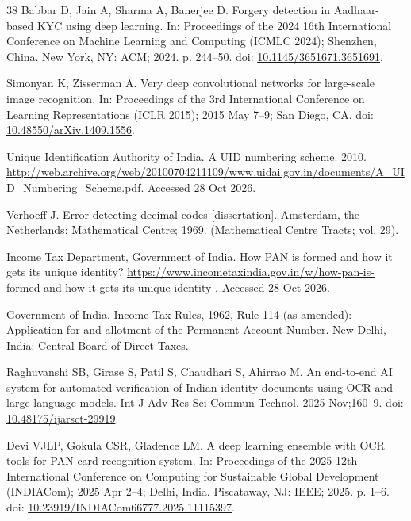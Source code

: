 \documentclass[12pt]{article}
\begin{document}
\begin{thebibliography}{38}
Babbar D, Jain A, Sharma A, Banerjee D. Forgery detection in Aadhaar-based KYC using deep learning. In: Proceedings of the 2024 16th International Conference on Machine Learning and Computing (ICMLC 2024); Shenzhen, China. New York, NY: ACM; 2024. p. 244--50. doi: \href{https://doi.org/10.1145/3651671.3651691}{10.1145/3651671.3651691}.

Simonyan K, Zisserman A. Very deep convolutional networks for large-scale image recognition. In: Proceedings of the 3rd International Conference on Learning Representations (ICLR 2015); 2015 May 7--9; San Diego, CA. doi: \href{https://doi.org/10.48550/arXiv.1409.1556}{10.48550/arXiv.1409.1556}.

Unique Identification Authority of India. A UID numbering scheme. 2010. \url{http://web.archive.org/web/20100704211109/www.uidai.gov.in/documents/A_UID_Numbering_Scheme.pdf}. Accessed 28 Oct 2026.

Verhoeff J. Error detecting decimal codes [dissertation]. Amsterdam, the Netherlands: Mathematical Centre; 1969. (Mathematical Centre Tracts; vol. 29).

Income Tax Department, Government of India. How PAN is formed and how it gets its unique identity? \url{https://www.incometaxindia.gov.in/w/how-pan-is-formed-and-how-it-gets-its-unique-identity-}. Accessed 28 Oct 2026.

Government of India. Income Tax Rules, 1962, Rule 114 (as amended): Application for and allotment of the Permanent Account Number. New Delhi, India: Central Board of Direct Taxes.

Raghuvanshi SB, Girase S, Patil S, Chaudhari S, Ahirrao M. An end-to-end AI system for automated verification of Indian identity documents using OCR and large language models. Int J Adv Res Sci Commun Technol. 2025 Nov;160--9. doi: \href{https://doi.org/10.48175/ijarsct-29919}{10.48175/ijarsct-29919}.

Devi VJLP, Gokula CSR, Gladence LM. A deep learning ensemble with OCR tools for PAN card recognition system. In: Proceedings of the 2025 12th International Conference on Computing for Sustainable Global Development (INDIACom); 2025 Apr 2--4; Delhi, India. Piscataway, NJ: IEEE; 2025. p. 1--6. doi: \href{https://doi.org/10.23919/INDIACom66777.2025.11115397}{10.23919/INDIACom66777.2025.11115397}.


\end{thebibliography}
\end{document}
